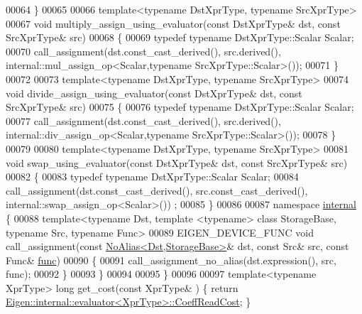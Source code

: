 \begin{DoxyCode}
00064   \}
00065 
00066   \textcolor{keyword}{template}<\textcolor{keyword}{typename} DstXprType, \textcolor{keyword}{typename} SrcXprType>
00067   \textcolor{keywordtype}{void} multiply\_assign\_using\_evaluator(\textcolor{keyword}{const} DstXprType& dst, \textcolor{keyword}{const} SrcXprType& src)
00068   \{
00069     \textcolor{keyword}{typedef} \textcolor{keyword}{typename} DstXprType::Scalar Scalar;
00070     call\_assignment(dst.const\_cast\_derived(), src.derived(), internal::mul\_assign\_op<Scalar,typename
       SrcXprType::Scalar>());
00071   \}
00072 
00073   \textcolor{keyword}{template}<\textcolor{keyword}{typename} DstXprType, \textcolor{keyword}{typename} SrcXprType>
00074   \textcolor{keywordtype}{void} divide\_assign\_using\_evaluator(\textcolor{keyword}{const} DstXprType& dst, \textcolor{keyword}{const} SrcXprType& src)
00075   \{
00076     \textcolor{keyword}{typedef} \textcolor{keyword}{typename} DstXprType::Scalar Scalar;
00077     call\_assignment(dst.const\_cast\_derived(), src.derived(), internal::div\_assign\_op<Scalar,typename
       SrcXprType::Scalar>());
00078   \}
00079   
00080   \textcolor{keyword}{template}<\textcolor{keyword}{typename} DstXprType, \textcolor{keyword}{typename} SrcXprType>
00081   \textcolor{keywordtype}{void} swap\_using\_evaluator(\textcolor{keyword}{const} DstXprType& dst, \textcolor{keyword}{const} SrcXprType& src)
00082   \{
00083     \textcolor{keyword}{typedef} \textcolor{keyword}{typename} DstXprType::Scalar Scalar;
00084     call\_assignment(dst.const\_cast\_derived(), src.const\_cast\_derived(), internal::swap\_assign\_op<Scalar>())
      ;
00085   \}
00086 
00087   \textcolor{keyword}{namespace }\hyperlink{namespaceinternal}{internal} \{
00088     \textcolor{keyword}{template}<\textcolor{keyword}{typename} Dst, \textcolor{keyword}{template} <\textcolor{keyword}{typename}> \textcolor{keyword}{class }StorageBase, \textcolor{keyword}{typename} Src, \textcolor{keyword}{typename} Func>
00089     EIGEN\_DEVICE\_FUNC \textcolor{keywordtype}{void} call\_assignment(\textcolor{keyword}{const} \hyperlink{group___core___module_class_eigen_1_1_no_alias}{NoAlias<Dst,StorageBase>}& dst, \textcolor{keyword}{
      const} Src& src, \textcolor{keyword}{const} Func& \hyperlink{structfunc}{func})
00090     \{
00091       call\_assignment\_no\_alias(dst.expression(), src, func);
00092     \}
00093   \}
00094   
00095 \}
00096 
00097 \textcolor{keyword}{template}<\textcolor{keyword}{typename} XprType> \textcolor{keywordtype}{long} get\_cost(\textcolor{keyword}{const} XprType& ) \{ \textcolor{keywordflow}{return} 
      \hyperlink{struct_eigen_1_1internal_1_1evaluator}{Eigen::internal::evaluator<XprType>::CoeffReadCost}; \}

\end{DoxyCode}
